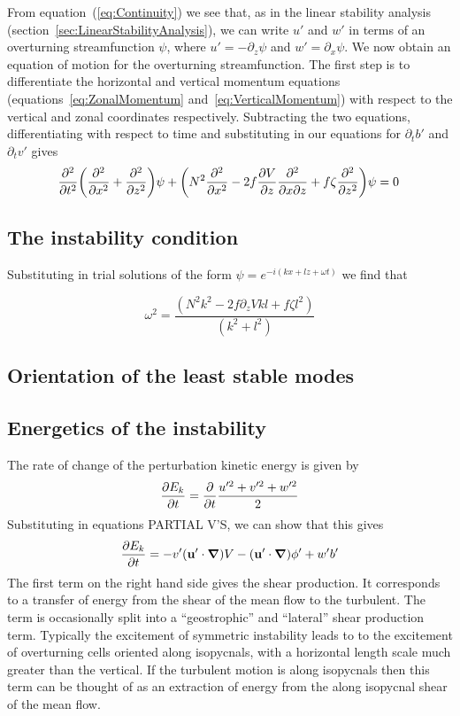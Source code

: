     From equation~(\ref{eq:Continuity}) we see that, as in the linear stability analysis (section~\ref{sec:LinearStabilityAnalysis}), we can write $u'$ and $w'$ in terms of an overturning streamfunction $\psi$, where $u' = - \partial_z \psi$ and $w' = \partial_x \psi$. We now obtain an equation of motion for the overturning streamfunction. The first step is to differentiate the horizontal and vertical momentum equations (equations~\ref{eq:ZonalMomentum} and~\ref{eq:VerticalMomentum}) with respect to the vertical and zonal coordinates respectively. Subtracting the two equations, differentiating with respect to time and substituting in our equations for $\partial_t b'$ and $\partial_t v'$ gives
    \begin{equation}
    \label{eq:OriginalHoskins}
    \pdv[2]{}{t} \bigg(\pdv[2]{}{x} + \pdv[2]{}{z}\bigg) \psi + \bigg( N^2 \pdv[2]{}{x} - 2 f \pdv{V}{z} \pdv[2]{}{x}{z} + f \zeta \pdv[2]{}{z} \bigg) \psi = 0 \,
    \end{equation}
    
    \subsection{The instability condition}
    Substituting in trial solutions of the form $\psi = e^{-i(kx + lz + \omega t)}$ we find that
    
    \begin{equation}
        \omega^2 = \frac{(N^2 k^2 - 2 f \partial_z V k l + f \zeta l^2)}{(k^2 + l^2)}
    \end{equation}
    
    \subsection{Orientation of the least stable modes}
    
    \subsection{Energetics of the instability}
    The rate of change of the perturbation kinetic energy is given by
    \begin{equation}
       \pdv{E_k}{t} = \frac{\partial}{\partial t} \frac{u'^2 + v'^2 + w'^2}{2}
    \end{equation}
    Substituting in equations PARTIAL V'S, we can show that this gives
    \begin{equation}
        \pdv{E_k}{t} = - v' (\mathbf{u}'\cdot \grad) V - (\mathbf{u}'\cdot \grad) \phi ' + w' b' 
    \end{equation}
    The first term on the right hand side gives the shear production. It corresponds to a transfer of energy from the shear of the mean flow to the turbulent. The term is occasionally split into a ``geostrophic'' and ``lateral'' shear production term. Typically the excitement of symmetric instability leads to to the excitement of overturning cells oriented along isopycnals, with a horizontal length scale much greater than the vertical. If the turbulent motion is along isopycnals then this term can be thought of as an extraction of energy from the along isopycnal shear of the mean flow.
    
